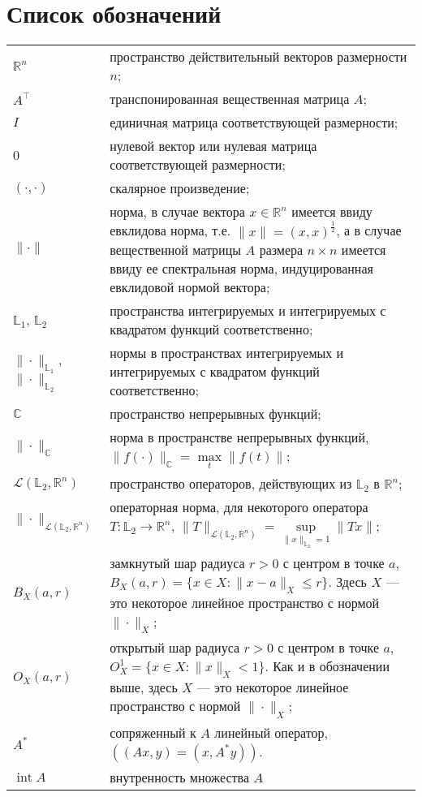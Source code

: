 \documentclass[../main.tex]{subfiles}
\begin{document}
\clearpage
\section*{Список обозначений}
\begin{tabularx}{\textwidth}{lY}
    $\mathbb{R}^n$ & пространство действительный векторов размерности $n$; \\ 
    $A^{\top}$ & транспонированная вещественная матрица $A$; \\ 
    $I$ & единичная матрица соответствующей размерности; \\ 
    $0$ & нулевой вектор или нулевая матрица соответствующей размерности; \\
    $(\cdot,\cdot)$ & скалярное произведение; \\
    $\| \cdot\| $ &  норма, в случае вектора $x \in \mathbb{R}^n$ имеется ввиду евклидова норма,  т.е. $\|x\| = (x,x)^{\frac{1}{2}}$, а в случае вещественной  матрицы $A$ размера $n \times n$ имеется ввиду ее спектральная норма, индуцированная евклидовой нормой вектора; \\
    $\mathbb{L}_1$, $\mathbb{L}_2$ & пространства интегрируемых и интегрируемых с квадратом функций соответственно; \\
    $\|\cdot\|_{\mathbb{L}_1}$, $\|\cdot\|_{\mathbb{L}_2}$ & нормы в пространствах интегрируемых и интегрируемых с квадратом функций соответственно; \\
    $ \mathbb{C} $ & пространство непрерывных функций; \\
    $\|\cdot\|_\mathbb{C}$ & норма в пространстве непрерывных функций, $\|f(\cdot) \|_\mathbb{C} = \max\limits_{t} \|f(t)\|$; \\
    $\mathcal{L}(\mathbb{L}_2, \mathbb{R}^n)$ & пространство операторов, действующих из $\mathbb{L}_2$ в  $\mathbb{R}^n$; \\ 
    $\| \cdot \|_{\mathcal{L}(\mathbb{L}_2, \mathbb{R}^n)}$ &  операторная норма, для некоторого оператора $T:  \mathbb{L}_2 \to \mathbb{R}^n $, $\| T \|_{\mathcal{L}(\mathbb{L}_2, \mathbb{R}^n)} = \sup\limits_{\|x\|_{\mathbb{L}_2} = 1} \| T x \| $;\\
    $B_X(a,r)$ & замкнутый шар радиуса $r>0$ с центром в точке $a$, $B_X(a, r) = \{x\in X: \|x-a\|_X \leqslant r \}$. Здесь $X$ --- это некоторое линейное пространство с нормой $\|\cdot\|_X$; \\
    $O_{X}(a, r)$  & открытый шар радиуса $r>0$ с центром в точке $a$, $O_{X}^1 = \{x\in X: \|x\|_{X} < 1 \}$. Как и в обозначении выше, здесь $X$ --- это некоторое линейное пространство с нормой $\|\cdot\|_X$; \\
    $ A^* $ & сопряженный к $A$ линейный оператор, $((Ax, y) = (x, A^*y))$. \\
    $ \operatorname{int}A $   & внутренность множества $A$ \\
\end{tabularx}
\end{document}
